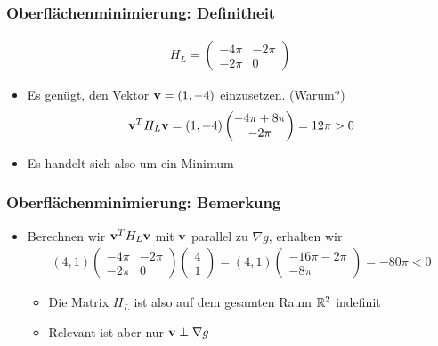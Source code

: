 \begin{frame}
  \frametitle<presentation>{Oberflächenminimierung: Definitheit}
  \begin{gather*}
    H_L =
    \begin{pmatrix}
      -4\pi & -2\pi\\
      -2\pi & 0
    \end{pmatrix}
  \end{gather*}
  \begin{itemize}
  \item Es genügt, den Vektor $\mathbf{v}=(1,-4)$ einzusetzen. (Warum?)
    \begin{gather*}
      \mathbf{v}^T H_L\mathbf{v} = (1,-4)
      \begin{pmatrix}
        -4\pi + 8\pi\\-2\pi
      \end{pmatrix}
      = 12\pi > 0
    \end{gather*}
  \item Es handelt sich also um ein Minimum
  \end{itemize}
\end{frame}

\begin{frame}
  \frametitle<presentation>{Oberflächenminimierung: Bemerkung}
  \begin{itemize}
  \item Berechnen wir $\mathbf{v}^TH_L\mathbf{v}$ mit $\mathbf{v}$ parallel zu $\nabla g$, erhalten wir
    \begin{gather*}
      (4,1)
      \begin{pmatrix}
        -4\pi & -2\pi\\
        -2\pi & 0
      \end{pmatrix}
      \begin{pmatrix}
        4\\1
      \end{pmatrix}
      = (4,1)
      \begin{pmatrix}
        -16\pi -2\pi\\-8\pi
      \end{pmatrix}
      = -80 \pi < 0
    \end{gather*}
    \begin{itemize}
    \item Die Matrix $H_L$ ist also auf dem gesamten Raum $\mathbb R^2$ indefinit
    \item Relevant ist aber nur $\mathbf{v}\perp\nabla g$
    \end{itemize}
  \end{itemize}
\end{frame}

